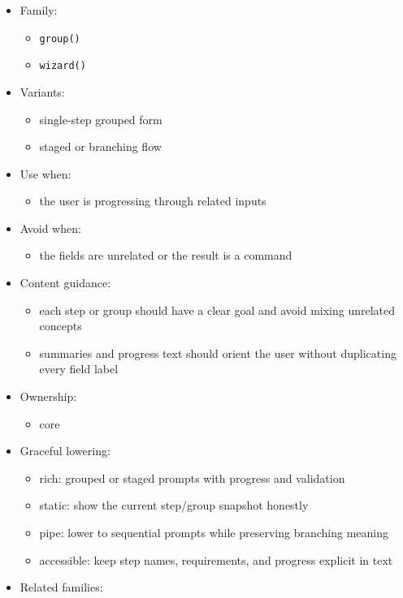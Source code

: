 \begin{itemize}
\tightlist
\item
  Family:

  \begin{itemize}
  \tightlist
  \item
    \texttt{g\allowbreak{}r\allowbreak{}o\allowbreak{}u\allowbreak{}p\allowbreak{}(\allowbreak{})}
  \item
    \texttt{w\allowbreak{}i\allowbreak{}z\allowbreak{}a\allowbreak{}r\allowbreak{}d\allowbreak{}(\allowbreak{})}
  \end{itemize}
\item
  Variants:

  \begin{itemize}
  \tightlist
  \item
    single-step grouped form
  \item
    staged or branching flow
  \end{itemize}
\item
  Use when:

  \begin{itemize}
  \tightlist
  \item
    the user is progressing through related inputs
  \end{itemize}
\item
  Avoid when:

  \begin{itemize}
  \tightlist
  \item
    the fields are unrelated or the result is a command
  \end{itemize}
\item
  Content guidance:

  \begin{itemize}
  \tightlist
  \item
    each step or group should have a clear goal and avoid mixing unrelated concepts
  \item
    summaries and progress text should orient the user without duplicating every field label
  \end{itemize}
\item
  Ownership:

  \begin{itemize}
  \tightlist
  \item
    core
  \end{itemize}
\item
  Graceful lowering:

  \begin{itemize}
  \tightlist
  \item
    rich: grouped or staged prompts with progress and validation
  \item
    static: show the current step/group snapshot honestly
  \item
    pipe: lower to sequential prompts while preserving branching meaning
  \item
    accessible: keep step names, requirements, and progress explicit in text
  \end{itemize}
\item
  Related families:


\end{itemize}

